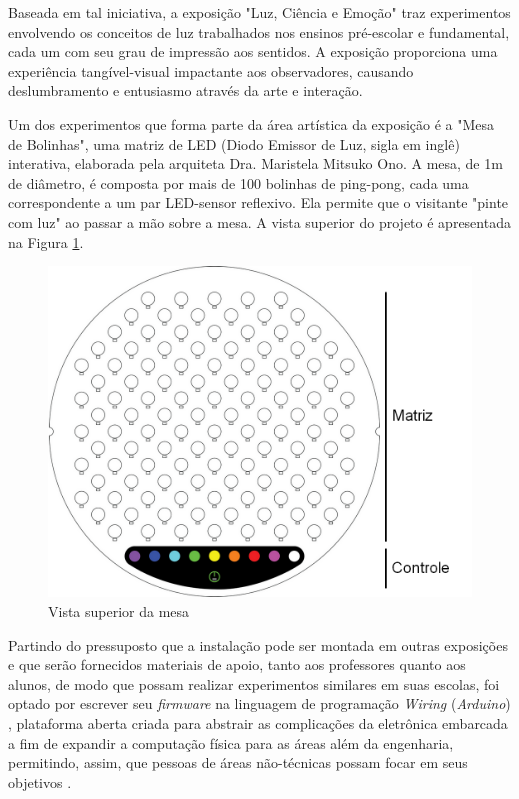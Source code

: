 \documentclass[a4paper,12pt]{article}
\begin{document}
  Baseada em tal iniciativa, a exposição "Luz, Ciência e Emoção" traz experimentos envolvendo os conceitos de luz trabalhados nos ensinos pré-escolar e fundamental, cada um com seu grau de impressão aos sentidos. A exposição proporciona uma experiência tangível-visual impactante aos observadores, causando deslumbramento e entusiasmo através da arte e interação.
  
  Um dos experimentos que forma parte da área artística da exposição é a "Mesa de Bolinhas", uma matriz de LED (Diodo Emissor de Luz, sigla em inglê) interativa, elaborada pela arquiteta Dra. Maristela Mitsuko Ono. A mesa, de 1m de diâmetro, é composta por mais de 100 bolinhas de ping-pong, cada uma correspondente a um par LED-sensor reflexivo. Ela permite que o visitante "pinte com luz" ao passar a mão sobre a mesa. A vista superior do projeto é apresentada na Figura \ref{fig:mesa-sup}.
  	
  \begin{figure}[!h]
    \caption{Vista superior da mesa}
    \label{fig:mesa-sup}
    \centering
    \includegraphics[width=0.8\linewidth]{img/mesa-cad.png}
  \end{figure}	
	
  Partindo do pressuposto que a instalação pode ser montada em outras exposições e que serão fornecidos materiais de apoio, tanto aos professores quanto aos alunos, de modo que possam realizar experimentos similares em suas escolas, foi optado por escrever seu \emph{firmware} na linguagem de programação \emph{Wiring} (\emph{Arduino}) \cite{arduinocc}, plataforma aberta criada para abstrair as complicações da eletrônica embarcada a fim de expandir a computação física para as áreas além da engenharia, permitindo, assim, que pessoas de áreas não-técnicas possam focar em seus objetivos \cite{wiring-tese}.
  
\end{document}
